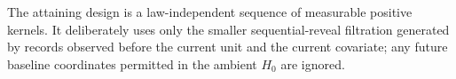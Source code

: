 The attaining design is a law-independent sequence of measurable positive kernels.  It deliberately uses only the smaller sequential-reveal filtration generated by records observed before the current unit and the current covariate; any future baseline coordinates permitted in the ambient \(H_0\) are ignored.
